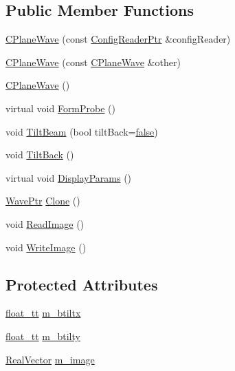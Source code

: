 \subsection*{Public Member Functions}
\begin{DoxyCompactItemize}
\item 
\hyperlink{class_q_s_t_e_m_1_1_c_plane_wave_a421425314a4c7f543e2dc39efeaf9463}{C\-Plane\-Wave} (const \hyperlink{namespace_q_s_t_e_m_af9424707fe9f6503298f49b41304bd35}{Config\-Reader\-Ptr} \&config\-Reader)
\item 
\hyperlink{class_q_s_t_e_m_1_1_c_plane_wave_acd10dfc6e070843e1ac72ae64ac354fc}{C\-Plane\-Wave} (const \hyperlink{class_q_s_t_e_m_1_1_c_plane_wave}{C\-Plane\-Wave} \&other)
\item 
\hyperlink{class_q_s_t_e_m_1_1_c_plane_wave_a3445688687cccd272918cbb23b1b9b88}{C\-Plane\-Wave} ()
\item 
virtual void \hyperlink{class_q_s_t_e_m_1_1_c_plane_wave_ae91ea6a98ce22da77e509ce0e3f1a9d9}{Form\-Probe} ()
\item 
void \hyperlink{class_q_s_t_e_m_1_1_c_plane_wave_ab2f1de8dae9fb2e3a5f0303eb7b47af6}{Tilt\-Beam} (bool tilt\-Back=\hyperlink{antlr3convertutf_8h_a65e9886d74aaee76545e83dd09011727}{false})
\item 
void \hyperlink{class_q_s_t_e_m_1_1_c_plane_wave_afc19dcfc2d396a24bed4fffd51a4b5c1}{Tilt\-Back} ()
\item 
virtual void \hyperlink{class_q_s_t_e_m_1_1_c_plane_wave_a914eeba909b3c90bb18da53844eec01e}{Display\-Params} ()
\item 
\hyperlink{namespace_q_s_t_e_m_ab42c5fe058973736465964e84b504b74}{Wave\-Ptr} \hyperlink{class_q_s_t_e_m_1_1_c_plane_wave_a17bbfe09446b8fbc20e8cb1ece0cc147}{Clone} ()
\item 
void \hyperlink{class_q_s_t_e_m_1_1_c_plane_wave_a6b9fe90895773a71a8ce2c60ff0317a7}{Read\-Image} ()
\item 
void \hyperlink{class_q_s_t_e_m_1_1_c_plane_wave_a68f2f5ababe33996b41c8cb10d8b0f57}{Write\-Image} ()
\end{DoxyCompactItemize}
\subsection*{Protected Attributes}
\begin{DoxyCompactItemize}
\item 
\hyperlink{namespace_q_s_t_e_m_a915d7caa497280d9f927c4ce8d330e47}{float\-\_\-tt} \hyperlink{class_q_s_t_e_m_1_1_c_plane_wave_a6957cdb11b7953433ae8a5e40483a526}{m\-\_\-btiltx}
\item 
\hyperlink{namespace_q_s_t_e_m_a915d7caa497280d9f927c4ce8d330e47}{float\-\_\-tt} \hyperlink{class_q_s_t_e_m_1_1_c_plane_wave_ad3a475f7af67a75bf764ecef0609ba26}{m\-\_\-btilty}
\item 
\hyperlink{namespace_q_s_t_e_m_a8dfe9e1dbecce3838cb082d96e991ba7}{Real\-Vector} \hyperlink{class_q_s_t_e_m_1_1_c_plane_wave_ac176c624744dc2e0e08478af67802e24}{m\-\_\-image}
\end{DoxyCompactItemize}
